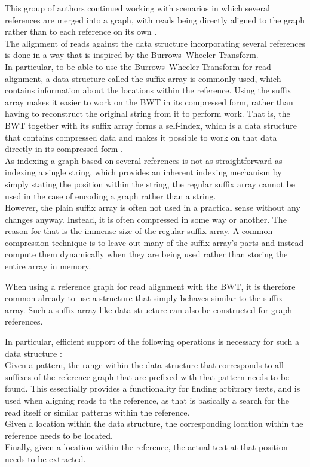 \documentclass[a4paper,12pt,twoside,BCOR=10mm]{scrbook}
\begin{document}
This group of authors continued working with scenarios in which 
several references are merged into a graph, with reads being directly 
aligned to the graph rather than to each reference on its own \citep{Siren2014}. \\
The alignment of reads against the data structure incorporating several references 
is done in a way that is inspired by the Burrows--Wheeler Transform. \\

In particular, to be able to use the Burrows--Wheeler Transform for read alignment, 
a data structure called the suffix array \citep{Puglisi2007} is commonly used, which contains 
information about the locations within the reference. 
Using the suffix array makes it easier to work on the BWT in its compressed form, 
rather than having to reconstruct the original string from it to perform work. 
That is, the BWT together with its suffix array forms a self-index, 
which is a data structure that contains compressed data and makes it possible 
to work on that data directly in its compressed form \citep{Navarro2007}. \\
As indexing a graph based on several references is not as straightforward as 
indexing a single string, which provides an inherent indexing mechanism by 
simply stating the position within the string, the regular suffix array cannot 
be used in the case of encoding a graph rather than a string. \\
However, the plain suffix array is often not used in a practical sense 
without any changes anyway. Instead, it is often compressed in some way or another. 
The reason for that is the immense size of the regular suffix array. 
A common compression technique is to leave out many of the suffix array's parts 
and instead compute them dynamically 
when they are being used rather than storing the entire array in memory. 

When using a reference graph for read alignment with the BWT, it is therefore common 
already to use a structure that simply behaves similar to the suffix array. 
Such a suffix-array-like data structure can also be constructed for graph references.

In particular, efficient support of the following operations is necessary for such a data structure \citep{Siren2014}: \\
Given a pattern, the range within the data structure 
that corresponds to all suffixes of the reference graph that are prefixed with that pattern needs to be found. 
This essentially provides a functionality for finding arbitrary texts, and is used when aligning reads to 
the reference, as that is basically a search for the read itself or similar patterns within the reference. \\
Given a location within the data structure, the corresponding location within the 
reference needs to be located. \\
Finally, given a location within the reference, the actual text at that position 
needs to be extracted.
\end{document}
